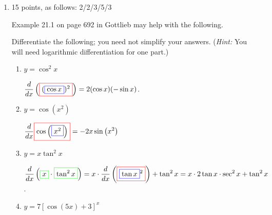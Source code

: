 \documentclass{article}
\begin{document}
\begin{enumerate}
\item

\begin{grading}
15 points, as follows: 2/2/3/5/3
\end{grading}

Example 21.1 on page 692 in
  Gottlieb may help with the following.

 Differentiate the following; you need not simplify
  your answers.  (\emph{Hint:} You will need logarithmic differentiation
  for one part.)

  \probonly{}
    \begin{enumerate}
    \item
      \begin{problem}[\vfill]
        $y =\cos^2x$
      \end{problem}

      \begin{solution}
        $\displaystyle
        \frac{d}{dx}\left(\fcolorbox{red}{white}{$(\fcolorbox{blue}{white}{$\cos
              x$})^2$}\right)= 2 (\cos x)(-\sin x)$.
      \end{solution}

    \item
      \begin{problem}[\vfill]
        $y = \cos(x^2)$
      \end{problem}

      \begin{solution}
        $\displaystyle \frac{d}{dx}\fcolorbox{red}{white}{$\cos\left(
            \fcolorbox{blue}{white}{$x^{2}$}
          \right)$}=-2x\sin\left(x^{2}\right)$
      \end{solution}

    \item
      \begin{problem}[\stretch{2}]
        $y = x\tan^2 x$
      \end{problem}

      \begin{solution}
        $\displaystyle \frac{d}{dx}
        \left(\fcolorbox{green}{white}{$\displaystyle x$}\cdot
          \fcolorbox{green}{white}{$\displaystyle \tan^2 x$} \right) =
        x\cdot \frac{d}{dx} \left(\fcolorbox{red}{white}{$\displaystyle
            \fcolorbox{blue}{white}{$\displaystyle \tan x$}^ { 2}
            $}\right)+ \tan^2 x = x\cdot 2 \tan x \cdot \sec^2 x + \tan^2
        x$.
      \end{solution}

    \item
      \begin{problem}[\nstretch{3}]
        $y = 7 [\cos(5x)+3]^x$
      \end{problem}


\end{enumerate}
\end{enumerate}
\end{document}
